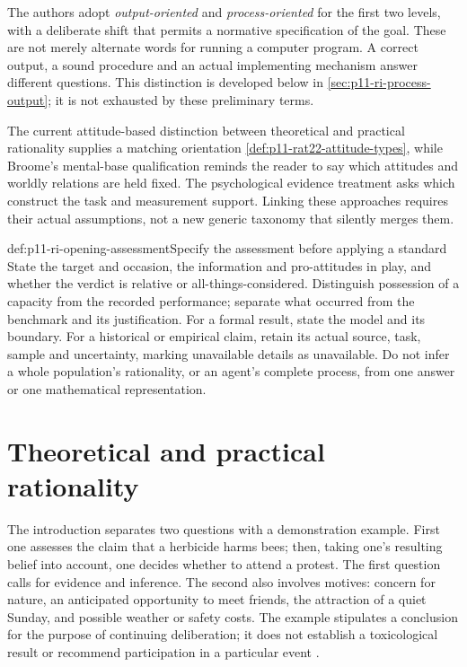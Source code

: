 The authors adopt \emph{output-oriented} and \emph{process-oriented}
for the first two levels, with a deliberate shift that permits a
normative specification of the goal. These are not merely alternate
words for running a computer program. A correct output, a sound
procedure and an actual implementing mechanism answer different
questions. This distinction is developed below in
\cref{sec:p11-ri-process-output}; it is not exhausted by these
preliminary terms.

The current attitude-based distinction between theoretical and
practical rationality supplies a matching orientation
\cref{def:p11-rat22-attitude-types}, while Broome's mental-base
qualification reminds the reader to say which attitudes and worldly
relations are held fixed. The psychological evidence treatment asks
which construct the task and measurement support. Linking these
approaches requires their actual assumptions, not a new generic
taxonomy that silently merges them.

\begin{hbmethod}{def:p11-ri-opening-assessment}{Specify the assessment before applying a standard}
State the target and occasion, the information and pro-attitudes in
play, and whether the verdict is relative or all-things-considered.
Distinguish possession of a capacity from the recorded performance;
separate what occurred from the benchmark and its justification.
For a formal result, state the model and its boundary. For a
historical or empirical claim, retain its actual source, task,
sample and uncertainty, marking unavailable details as unavailable.
Do not infer a whole population's rationality, or an agent's complete
process, from one answer or one mathematical representation.
\end{hbmethod}

\section{Theoretical and practical rationality}
\label{sec:p11-ri-theoretical-practical}

The introduction separates two questions with a demonstration example.
First one assesses the claim that a herbicide harms bees; then, taking
one's resulting belief into account, one decides whether to attend a
protest. The first question calls for evidence and inference. The second
also involves motives: concern for nature, an anticipated opportunity
to meet friends, the attraction of a quiet Sunday, and possible weather
or safety costs. The example stipulates a conclusion for the purpose
of continuing deliberation; it does not establish a toxicological result
or recommend participation in a particular event
\cite[pp.~10--11]{KnauffSpohn2021FrameworksIntro}.

